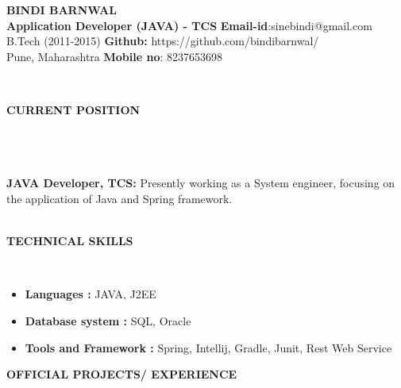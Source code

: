 \documentclass[a4paper,10pt]{article}
\newcommand{\lsep}{-0.5cm}
\newcommand{\resheading}[1]{{\small \colorbox{mygrey}{\begin{minipage}{0.975\textwidth}{\textbf{#1 \vphantom{p\^{E}}}}\end{minipage}}}}
\begin{document}
\begin{center}
\textbf{\Huge BINDI BARNWAL \\ }  
\indent \hfill \break
\indent \textbf{Application Developer (JAVA) - TCS} \hfill \textbf{Email-id}:{sinebindi@gmail.com} \\
\indent B.Tech (2011-2015)  \hfill \textbf{Github:} {https://github.com/bindibarnwal/} \\
\indent Pune, Maharashtra \hfill \textbf{Mobile no}: {8237653698} \\
\end{center}

\hspace{0.3cm}\\[-0.1cm]
\resheading{\textbf{CURRENT POSITION} }\\[\lsep] \\ \\
\textbf{JAVA Developer, TCS: } Presently working as a System engineer, focusing on the application of Java and Spring framework. \\
\hspace{0.5cm}\\[-0.2cm]
\resheading{\textbf{TECHNICAL SKILLS} }\\[\lsep]
\begin{itemize}
\item \textbf{Languages :} JAVA, J2EE
\item \textbf{Database system :} SQL, Oracle 
\item \textbf{Tools and Framework :} Spring, Intellij, Gradle, Junit, Rest Web Service 
\end{itemize}
\resheading{\textbf{OFFICIAL PROJECTS/ EXPERIENCE} }\\[\lsep]
\end{document}
